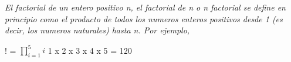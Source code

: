 \documentclass{article}
\begin{document}
    \noindent
    \textit{El factorial de un entero positivo n, el factorial de n o n factorial se define en principio como el producto de todos los
    numeros enteros positivos desde 1 (es decir, los numeros naturales) hasta n. Por ejemplo,}

    ! = $\prod_{i=1}^{5} i$ 1 x 2 x 3 x 4 x 5 = 120
\end{document}
